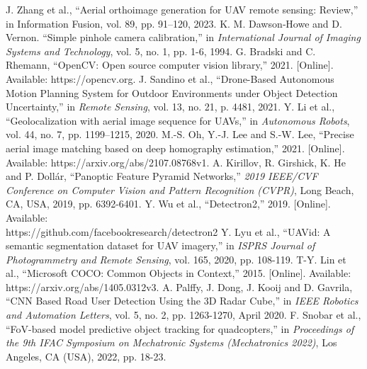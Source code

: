 \documentclass[conference]{IEEEtran}
\begin{document}
\begin{thebibliography}{00}
 J. Zhang et al., ``Aerial orthoimage generation for UAV remote sensing: Review,'' in Information Fusion, vol. 89, pp. 91–120, 2023.
 K. M. Dawson‐Howe and D. Vernon. ``Simple pinhole camera calibration,'' in \textit{International Journal of Imaging Systems and Technology}, vol. 5, no. 1, pp. 1-6, 1994.
 G. Bradski and C. Rhemann, ``OpenCV: Open source computer vision library,'' 2021. [Online]. Available: https://opencv.org.
 J. Sandino et al., ``Drone-Based Autonomous Motion Planning System for Outdoor Environments under Object Detection Uncertainty,'' in \textit{Remote Sensing}, vol. 13, no. 21, p. 4481, 2021.
 Y. Li et al., ``Geolocalization with aerial image sequence for UAVs,'' in \textit{Autonomous Robots}, vol. 44, no. 7, pp. 1199–1215, 2020.
 M.-S. Oh, Y.-J. Lee and S.-W. Lee, ``Precise aerial image matching based on deep homography estimation,'' 2021. [Online]. Available: https://arxiv.org/abs/2107.08768v1.
 A. Kirillov, R. Girshick, K. He and P. Dollár, ``Panoptic Feature Pyramid Networks,'' \textit{2019 IEEE/CVF Conference on Computer Vision and Pattern Recognition (CVPR)}, Long Beach, CA, USA, 2019, pp. 6392-6401.
 Y. Wu et al., ``Detectron2,'' 2019. [Online]. Available:\\ https://github.com/facebookresearch/detectron2
 Y. Lyu et al., ``UAVid: A semantic segmentation dataset for UAV imagery,'' in \textit{ISPRS Journal of Photogrammetry and Remote Sensing}, vol. 165, 2020, pp. 108-119. 
 T-Y. Lin et al., ``Microsoft COCO: Common Objects in Context,'' 2015. [Online]. Available: https://arxiv.org/abs/1405.0312v3.
 A. Palffy, J. Dong, J. Kooij and D. Gavrila, ``CNN Based Road User Detection Using the 3D Radar Cube,'' in \textit{IEEE Robotics and Automation Letters}, vol. 5, no. 2, pp. 1263-1270, April 2020.
 F. Snobar et al., ``FoV-based model predictive object tracking for quadcopters,'' in \textit{Proceedings of the 9th IFAC Symposium on Mechatronic Systems (Mechatronics 2022)}, Los Angeles, CA (USA), 2022, pp. 18-23.
\end{thebibliography}
\end{document}
